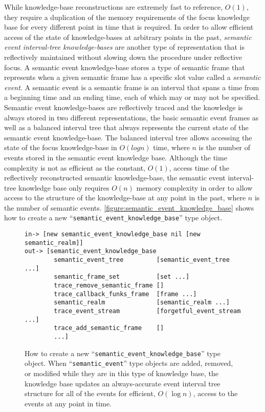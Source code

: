 While knowledge-base reconstructions are extremely fast to reference,
$O(1)$, they require a duplication of the memory requirements of the
focus knowledge base for every different point in time that is
required.  In order to allow efficient access of the state of
knowledge-bases at arbitrary points in the past, \emph{semantic event
  interval-tree knowledge-bases} are another type of representation
that is reflectively maintained without slowing down the procedure
under reflective focus.  A semantic event knowledge-base stores a type
of semantic frame that represents when a given semantic frame has a
specific slot value called a \emph{semantic event}.  A semantic event
is a semantic frame is an interval that spans a time from a beginning
time and an ending time, each of which may or may not be specified.
Semantic event knowledge-bases are reflectively traced and the
knowledge is always stored in two different representations, the basic
semantic event frames as well as a balanced interval tree that always
represents the current state of the semantic event knowledge-base.
The balanced interval tree allows accessing the state of the focus
knowledge-base in $O(log n)$ time, where $n$ is the number of events
stored in the semantic event knowledge base.  Although the time
complexity is not as efficient as the constant, $O(1)$, access time of
the reflectively reconstructed semantic knowledge-base, the semantic
event interval-tree knowledge base only requires $O(n)$ memory
complexity in order to allow access to the structure of the
knowledge-base at any point in the past, where $n$ is the number of
semantic events.
{\mbox{\autoref{figure:semantic_event_knowledge_base}}} shows how to
create a new ``{\tt{semantic\_event\_knowledge\_base}}'' type object.
\begin{figure}[h]
\centering
{\small
\begin{Verbatim}[frame=single]
 in-> [new semantic_event_knowledge_base nil [new semantic_realm]]
out-> [semantic_event_knowledge_base
        semantic_event_tree         [semantic_event_tree ...]
        semantic_frame_set          [set ...]
        trace_remove_semantic_frame []
        trace_callback_funks_frame  [frame ...]
        semantic_realm              [semantic_realm ...]
        trace_event_stream          [forgetful_event_stream ...]
        trace_add_semantic_frame    []
        ...]
\end{Verbatim}
}
\caption[How to create a new
  ``{\tt{semantic\_event\_knowledge\_base}}'' type object.]{How to
  create a new ``{\tt{semantic\_event\_knowledge\_base}}'' type
  object.  When ``{\tt{semantic\_event}}'' type objects are added,
  removed, or modified while they are in this type of knowledge base,
  the knowledge base updates an always-accurate event interval tree
  structure for all of the events for efficient, $O(\log n)$, access
  to the events at any point in time.}
\label{figure:semantic_event_knowledge_base}
\end{figure}

